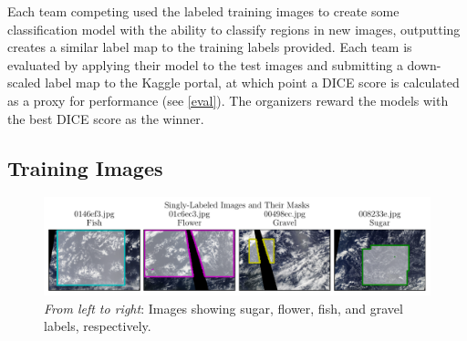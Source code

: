 Each team competing used the labeled training images to create some classification model with the ability to classify regions in new images, outputting creates a similar label map to the training labels provided. Each team is evaluated by applying their model to the test images and submitting a down-scaled label map to the Kaggle portal, at which point a DICE score is calculated as a proxy for performance (see \cref{eval}). The organizers reward the models with the best DICE score as the winner. 

\subsection{Training Images}
\begin{figure}[htbp]
    \centering
    \includegraphics[width=\linewidth]{figs/single_labels.pdf}
    \caption{\textit{From left to right}: Images showing sugar, flower, fish, and gravel labels, respectively.}
    \label{fig:labeled_imgs}
\end{figure}
%
